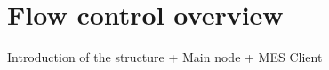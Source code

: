 \section{Flow control overview} %
\label{sec:mr_flow_control_overview}

Introduction of the structure + Main node + MES Client

